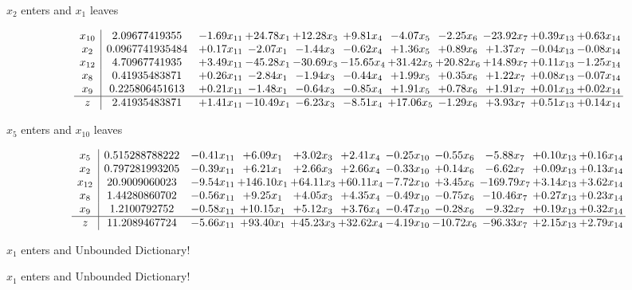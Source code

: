 \documentclass[9pt]{article}
\begin{document}
 $ x_{2} $ enters and $ x_{1} $ leaves 

 \[\begin{array}{c| c c@{\hskip 2pt} c@{\hskip 2pt} c@{\hskip 2pt} c@{\hskip 2pt} c@{\hskip 2pt} c@{\hskip 2pt} c@{\hskip 2pt} c@{\hskip 2pt} c@{\hskip 2pt} }
 x_{10}   &  2.09677419355 & -1.69 x_{11} & + 24.78 x_{1} & + 12.28 x_{3} & +  9.81 x_{4} & -4.07 x_{5} & -2.25 x_{6} & -23.92 x_{7} & +  0.39 x_{13} & +  0.63 x_{14}\\
 x_{2}   &  0.0967741935484 & +  0.17 x_{11} & -2.07 x_{1} & -1.44 x_{3} & -0.62 x_{4} & +  1.36 x_{5} & +  0.89 x_{6} & +  1.37 x_{7} & -0.04 x_{13} & -0.08 x_{14}\\
 x_{12}   &  4.70967741935 & +  3.49 x_{11} & -45.28 x_{1} & -30.69 x_{3} & -15.65 x_{4} & + 31.42 x_{5} & + 20.82 x_{6} & + 14.89 x_{7} & +  0.11 x_{13} & -1.25 x_{14}\\
 x_{8}   &  0.41935483871 & +  0.26 x_{11} & -2.84 x_{1} & -1.94 x_{3} & -0.44 x_{4} & +  1.99 x_{5} & +  0.35 x_{6} & +  1.22 x_{7} & +  0.08 x_{13} & -0.07 x_{14}\\
 x_{9}   &  0.225806451613 & +  0.21 x_{11} & -1.48 x_{1} & -0.64 x_{3} & -0.85 x_{4} & +  1.91 x_{5} & +  0.78 x_{6} & +  1.91 x_{7} & +  0.01 x_{13} & +  0.02 x_{14}\\
\hline
z    &  2.41935483871 & +  1.41 x_{11} & -10.49 x_{1} & -6.23 x_{3} & -8.51 x_{4} & + 17.06 x_{5} & -1.29 x_{6} & +  3.93 x_{7} & +  0.51 x_{13} & +  0.14 x_{14}\\
\end{array}\]


 $ x_{5} $ enters and $ x_{10} $ leaves 

 \[\begin{array}{c| c c@{\hskip 2pt} c@{\hskip 2pt} c@{\hskip 2pt} c@{\hskip 2pt} c@{\hskip 2pt} c@{\hskip 2pt} c@{\hskip 2pt} c@{\hskip 2pt} c@{\hskip 2pt} }
 x_{5}   &  0.515288788222 & -0.41 x_{11} & +  6.09 x_{1} & +  3.02 x_{3} & +  2.41 x_{4} & -0.25 x_{10} & -0.55 x_{6} & -5.88 x_{7} & +  0.10 x_{13} & +  0.16 x_{14}\\
 x_{2}   &  0.797281993205 & -0.39 x_{11} & +  6.21 x_{1} & +  2.66 x_{3} & +  2.66 x_{4} & -0.33 x_{10} & +  0.14 x_{6} & -6.62 x_{7} & +  0.09 x_{13} & +  0.13 x_{14}\\
 x_{12}   &  20.9009060023 & -9.54 x_{11} & + 146.10 x_{1} & + 64.11 x_{3} & + 60.11 x_{4} & -7.72 x_{10} & +  3.45 x_{6} & -169.79 x_{7} & +  3.14 x_{13} & +  3.62 x_{14}\\
 x_{8}   &  1.44280860702 & -0.56 x_{11} & +  9.25 x_{1} & +  4.05 x_{3} & +  4.35 x_{4} & -0.49 x_{10} & -0.75 x_{6} & -10.46 x_{7} & +  0.27 x_{13} & +  0.23 x_{14}\\
 x_{9}   &  1.2100792752 & -0.58 x_{11} & + 10.15 x_{1} & +  5.12 x_{3} & +  3.76 x_{4} & -0.47 x_{10} & -0.28 x_{6} & -9.32 x_{7} & +  0.19 x_{13} & +  0.32 x_{14}\\
\hline
z    &  11.2089467724 & -5.66 x_{11} & + 93.40 x_{1} & + 45.23 x_{3} & + 32.62 x_{4} & -4.19 x_{10} & -10.72 x_{6} & -96.33 x_{7} & +  2.15 x_{13} & +  2.79 x_{14}\\
\end{array}\]


 $ x_{1} $ enters and Unbounded Dictionary!


 $ x_{1} $ enters and Unbounded Dictionary!
\end{document}
